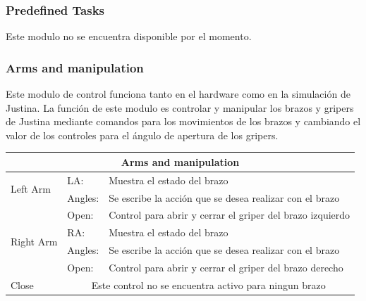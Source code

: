 \documentclass[user_manual.tex]{subfiles}
\begin{document}
\subsubsection{Predefined Tasks}

Este modulo no se encuentra disponible por el momento. 

\subsubsection{Arms and manipulation}

Este modulo de control funciona tanto en el hardware como en la simulación de Justina. La función de este modulo es controlar y manipular los brazos y gripers de Justina mediante comandos para los movimientos de los brazos y cambiando el valor de los controles para el ángulo de apertura de los gripers.

\begin{table}[H]
\begin{center}
\begin{tabular}{|l|l|l|}%

\hline
\multicolumn{3}{|c|}{Arms and manipulation}                                                         \\ \hline
\multirow{2}{3cm}{Left Arm}  &  LA:     & Muestra el estado del brazo                                \\ \cline{2-3}
                             &  Angles: & Se escribe la acción que se desea realizar con el brazo     \\ \cline{2-3}
                             &  Open:   & Control para abrir y cerrar el griper del brazo izquierdo    \\ \hline
\multirow{2}{3cm}{Right Arm} &  RA:     & Muestra el estado del brazo                                   \\ \cline{2-3}
                             &  Angles: & Se escribe la acción que se desea realizar con el brazo        \\ \cline{2-3}
                             &  Open:   & Control para abrir y cerrar el griper del brazo derecho         \\ \hline 
Close                        & \multicolumn{2}{|c|}{Este control no se encuentra activo para ningun brazo} \\ \hline
\end{tabular}
\end{center}
\end{table}
\end{document}
